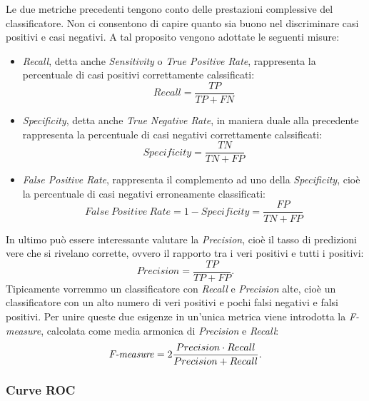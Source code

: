 Le due metriche precedenti tengono conto delle prestazioni complessive del classificatore. Non ci consentono di capire quanto sia buono nel discriminare casi positivi e casi negativi. A tal proposito vengono adottate le seguenti misure:
\begin{itemize}
\item \emph{Recall}, detta anche \emph{Sensitivity} o \emph{True Positive Rate}, rappresenta la percentuale di casi positivi correttamente calssificati:
\begin{equation*}
Recall = \frac{TP}{TP+FN}
\end{equation*}
\item \emph{Specificity}, detta anche  \emph{True Negative Rate}, in maniera duale alla precedente rappresenta la percentuale di casi negativi correttamente calssificati:
\begin{equation*}
Specificity = \frac{TN}{TN+FP}
\end{equation*}
\item \emph{False Positive Rate}, rappresenta il complemento ad uno della \emph{Specificity}, cioè la percentuale di casi negativi erroneamente classificati:
\begin{equation*}
False~Positive~Rate = 1 - Specificity =  \frac{FP}{TN+FP}
\end{equation*}
\end{itemize}
In ultimo può essere interessante valutare la \emph{Precision}, cioè il tasso di predizioni vere che si rivelano corrette, ovvero il rapporto tra i veri positivi e tutti i positivi:
\begin{equation*}
Precision = \frac{TP}{TP+FP}.
\end{equation*}
Tipicamente vorremmo un classificatore con \emph{Recall} e \emph{Precision} alte, cioè un classificatore con un alto numero di veri positivi e pochi falsi negativi e falsi positivi. Per unire queste due esigenze in un'unica metrica viene introdotta la \emph{F-measure}, calcolata come media armonica di \emph{Precision} e \emph{Recall}:
\begin{equation*}
\text{\emph{F-measure}} = 2\frac{Precision \cdot Recall}{Precision+Recall}.
\end{equation*}


\subsubsection{Curve ROC}

